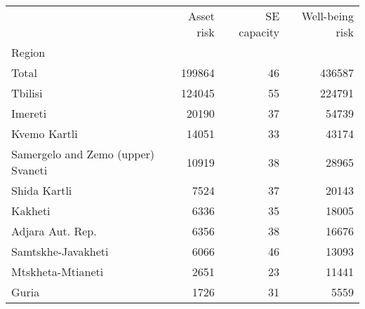 \begin{tabular}{lrrr}
\toprule
{} &  Asset risk &  SE capacity &  Well-being risk \\
Region                             &             &              &                  \\
\midrule
Total                              &      199864 &           46 &           436587 \\
Tbilisi                            &      124045 &           55 &           224791 \\
Imereti                            &       20190 &           37 &            54739 \\
Kvemo Kartli                       &       14051 &           33 &            43174 \\
Samergelo and Zemo (upper) Svaneti &       10919 &           38 &            28965 \\
Shida Kartli                       &        7524 &           37 &            20143 \\
Kakheti                            &        6336 &           35 &            18005 \\
Adjara Aut. Rep.                   &        6356 &           38 &            16676 \\
Samtskhe-Javakheti                 &        6066 &           46 &            13093 \\
Mtskheta-Mtianeti                  &        2651 &           23 &            11441 \\
Guria                              &        1726 &           31 &             5559 \\
\bottomrule
\end{tabular}
